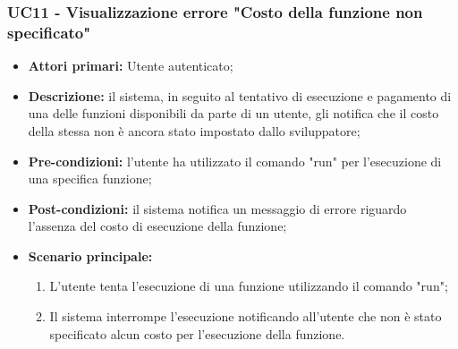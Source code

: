 \subsubsection{UC11 - Visualizzazione errore "Costo della funzione non specificato"}
\begin{itemize}
	\item \textbf{Attori primari:} Utente autenticato;
	\item \textbf{Descrizione:} il sistema, in seguito al tentativo di esecuzione e pagamento di una delle funzioni disponibili da parte di un utente, gli notifica che il costo della stessa non è ancora stato impostato dallo sviluppatore; 
	\item \textbf{Pre-condizioni:} l'utente ha utilizzato il comando "run" per l'esecuzione di una specifica funzione;
	\item \textbf{Post-condizioni:} il sistema notifica un messaggio di errore riguardo l'assenza del costo di esecuzione della funzione;
	\item \textbf{Scenario principale:} 
	\begin{enumerate}
		\item L'utente tenta l'esecuzione di una funzione utilizzando il comando "run";
		\item Il sistema interrompe l'esecuzione notificando all'utente che non è stato specificato alcun costo per l'esecuzione della funzione.
	\end{enumerate}
\end{itemize}